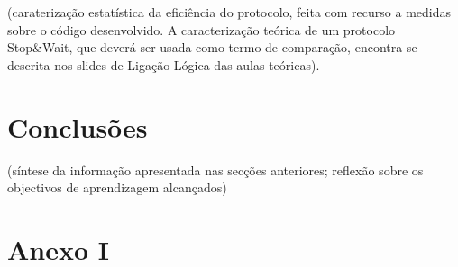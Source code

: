 \documentclass[a4paper, 11pt]{article}
\begin{document}
   (caraterização estatística da  eficiência do protocolo, feita com recurso a medidas sobre o código desenvolvido. A caracterização teórica de um protocolo Stop\&Wait, que deverá ser usada como termo de comparação, encontra-se descrita nos slides de Ligação Lógica das aulas teóricas). 
\newpage

\section{Conclusões}

  (síntese da informação apresentada nas secções anteriores; reflexão sobre os objectivos de aprendizagem alcançados)
\newpage

\section{Anexo I}
\begin{lstlisting}[language=C]


\end{lstlisting}
\end{document}
